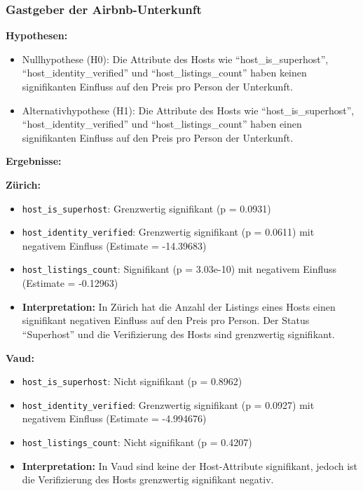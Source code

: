\documentclass[
  journal,
]{IEEEtran}%
\providecommand{\tightlist}{%
  \setlength{\itemsep}{0pt}\setlength{\parskip}{0pt}}\usepackage{longtable,booktabs,array}
\begin{document}
\hypertarget{gastgeber-der-airbnb-unterkunft}{%
\subsubsection{Gastgeber der
Airbnb-Unterkunft}\label{gastgeber-der-airbnb-unterkunft}}

\textbf{Hypothesen:}

\begin{itemize}
\tightlist
\item
  Nullhypothese (H0): Die Attribute des Hosts wie
  ``host\_is\_superhost'', ``host\_identity\_verified'' und
  ``host\_listings\_count'' haben keinen signifikanten Einfluss auf den
  Preis pro Person der Unterkunft.
\item
  Alternativhypothese (H1): Die Attribute des Hosts wie
  ``host\_is\_superhost'', ``host\_identity\_verified'' und
  ``host\_listings\_count'' haben einen signifikanten Einfluss auf den
  Preis pro Person der Unterkunft.
\end{itemize}

\textbf{Ergebnisse:}

\textbf{Zürich:}

\begin{itemize}
\item
  \texttt{host\_is\_superhost}: Grenzwertig signifikant (p = 0.0931)
\item
  \texttt{host\_identity\_verified}: Grenzwertig signifikant (p =
  0.0611) mit negativem Einfluss (Estimate = -14.39683)
\item
  \texttt{host\_listings\_count}: Signifikant (p = 3.03e-10) mit
  negativem Einfluss (Estimate = -0.12963)
\item
  \textbf{Interpretation:} In Zürich hat die Anzahl der Listings eines
  Hosts einen signifikant negativen Einfluss auf den Preis pro Person.
  Der Status ``Superhost'' und die Verifizierung des Hosts sind
  grenzwertig signifikant.
\end{itemize}

\textbf{Vaud:}

\begin{itemize}
\item
  \texttt{host\_is\_superhost}: Nicht signifikant (p = 0.8962)
\item
  \texttt{host\_identity\_verified}: Grenzwertig signifikant (p =
  0.0927) mit negativem Einfluss (Estimate = -4.994676)
\item
  \texttt{host\_listings\_count}: Nicht signifikant (p = 0.4207)
\item
  \textbf{Interpretation:} In Vaud sind keine der Host-Attribute
  signifikant, jedoch ist die Verifizierung des Hosts grenzwertig
  signifikant negativ.
\end{itemize}
\end{document}
